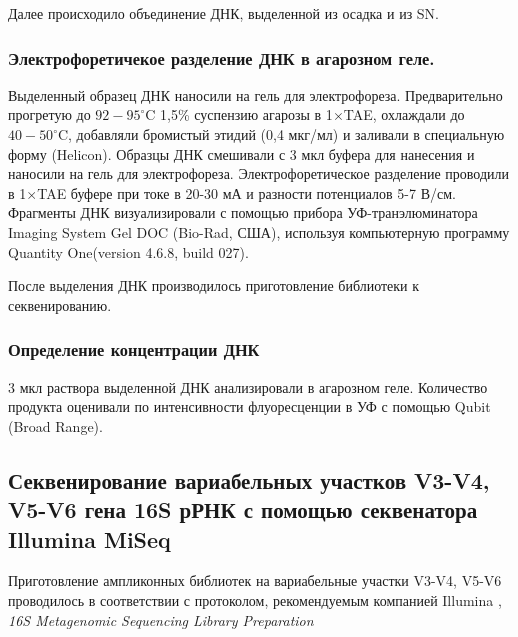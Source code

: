 Далее происходило объединение ДНК, выделенной из осадка и из SN. 

\subsubsection{ Электрофоретичекое разделение ДНК в агарозном геле.} 

Выделенный образец ДНК наносили на гель для электрофореза. Предварительно прогретую до $92-95^{\circ}$C 1,5\% суспензию агарозы в 1$\times$TAE, охлаждали до  $40-50^{\circ}$C, добавляли бромистый этидий (0,4 мкг/мл) и заливали в специальную форму (Helicon). Образцы ДНК  смешивали с 3 мкл буфера для нанесения и наносили на гель для электрофореза. Электрофоретическое разделение проводили в 1$\times$TAE буфере при токе в 20-30 мА и разности потенциалов 5-7 В/см. Фрагменты ДНК визуализировали с помощью прибора УФ-транэлюминатора Imaging System Gel DOC (Bio-Rad, США), используя компьютерную программу Quantity One(version 4.6.8, build 027). 

После выделения ДНК производилось приготовление библиотеки к секвенированию.

\subsubsection{Определение концентрации ДНК}

3 мкл раствора выделенной ДНК анализировали в агарозном геле. Количество продукта оценивали по интенсивности флуоресценции в УФ с помощью Qubit (Broad Range). 

\subsection{Секвенирование вариабельных участков V3-V4, V5-V6 гена 16S рРНК с помощью секвенатора Illumina MiSeq }  \label{subsect1_2_2}

Приготовление ампликонных библиотек на вариабельные участки V3-V4, V5-V6 проводилось  в соответствии с протоколом, рекомендуемым компанией Illumina , \textit{16S Metagenomic Sequencing Library Preparation }

